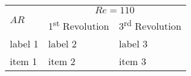 \documentclass{article}
\begin{document}
\fancyheadoffset{0pt}%







\begin{tabularx}{\linewidth}{|m{3.5cm}|m{4.5cm}|m{3.5cm}|}   
 \hline

  \multirow{2}{*}{$AR$}  &  \multicolumn{2}{c}{$Re=110$}  \\
  & 1\textsuperscript{st} Revolution & 3\textsuperscript{rd} Revolution \\
 \endhead
 \hline



 label 1 & label 2 & label 3  \\
  \hline 
  item 1  & item 2  & item 3   \\
  \hline

   

\end{tabularx}



  
\end{document}
